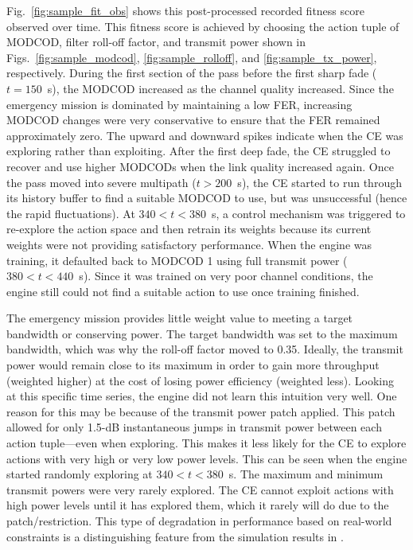 \documentclass[journal]{IEEEtran}
\begin{document}
Fig.~\ref{fig:sample_fit_obs} shows this post-processed recorded fitness score observed over time.  This fitness score is achieved by choosing the action tuple of MODCOD, filter roll-off factor, and transmit power shown in Figs.~\ref{fig:sample_modcod}, \ref{fig:sample_rolloff}, and \ref{fig:sample_tx_power}, respectively.  During the first section of the pass before the first sharp fade ($t=150$~s), the MODCOD increased as the channel quality increased.  Since the emergency mission is dominated by maintaining a low FER, increasing MODCOD changes were very conservative to ensure that the FER remained approximately zero.  The upward and downward spikes indicate when the CE was exploring rather than exploiting.  After the first deep fade, the CE struggled to recover and use higher MODCODs when the link quality increased again.  Once the pass moved into severe multipath ($t>200$~s), the CE started to run through its history buffer to find a suitable MODCOD to use, but was unsuccessful (hence the rapid fluctuations).  At $340<t<380$~s, a control mechanism was triggered to re-explore the action space and then retrain its weights because its current weights were not providing satisfactory performance.  When the engine was training, it defaulted back to MODCOD 1 using full transmit power ($380<t<440$~s).  Since it was trained on very poor channel conditions, the engine still could not find a suitable action to use once training finished.

The emergency mission provides little weight value to meeting a target bandwidth or conserving power.  The target bandwidth was set to the maximum bandwidth, which was why the roll-off factor moved to 0.35.  Ideally, the transmit power would remain close to its maximum in order to gain more throughput (weighted higher) at the cost of losing power efficiency (weighted less).  Looking at this specific time series, the engine did not learn this intuition very well.  One reason for this may be because of the transmit power patch applied.  This patch allowed for only 1.5-dB instantaneous jumps in transmit power between each action tuple---even when exploring.  This makes it less likely for the CE to explore actions with very high or very low power levels.  This can be seen when the engine started randomly exploring at $340<t<380$~s.  The maximum and minimum transmit powers were very rarely explored.  The CE cannot exploit actions with high power levels until it has explored them, which it rarely will do due to the patch/restriction.  This type of degradation in performance based on real-world constraints is a distinguishing feature from the simulation results in \cite{paulo-jrnl}.
\end{document}
